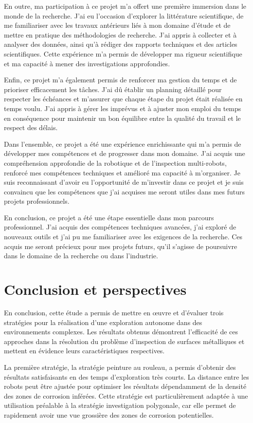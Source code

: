 \documentclass[francais,RandD]{rapportPFE}
\begin{document}
		En outre, ma participation à ce projet m'a offert une première immersion dans le monde de la recherche.
		J'ai eu l'occasion d'explorer la littérature scientifique, de me familiariser avec les travaux antérieurs liés à mon domaine d'étude et de mettre en pratique des méthodologies de recherche.
		J'ai appris à collecter et à analyser des données, ainsi qu'à rédiger des rapports techniques et des articles scientifiques.
		Cette expérience m'a permis de développer ma rigueur scientifique et ma capacité à mener des investigations approfondies.

		Enfin, ce projet m'a également permis de renforcer ma gestion du temps et de prioriser efficacement les tâches.
		J'ai dû établir un planning détaillé pour respecter les échéances et m'assurer que chaque étape du projet était réalisée en temps voulu.
		J'ai appris à gérer les imprévus et à ajuster mon emploi du temps en conséquence pour maintenir un bon équilibre entre la qualité du travail et le respect des délais.

		Dans l'ensemble, ce projet a été une expérience enrichissante qui m'a permis de développer mes compétences et de progresser dans mon domaine.
		J'ai acquis une compréhension approfondie de la robotique et de l'inspection multi-robots, renforcé mes compétences techniques et amélioré ma capacité à m'organiser.
		Je suis reconnaissant d'avoir eu l'opportunité de m'investir dans ce projet et je suis convaincu que les compétences que j'ai acquises me seront utiles dans mes futurs projets professionnels.

		En conclusion, ce projet a été une étape essentielle dans mon parcours professionnel.
		J'ai acquis des compétences techniques avancées, j'ai exploré de nouveaux outils et j'ai pu me familiariser avec les exigences de la recherche.
		Ces acquis me seront précieux pour mes projets futurs, qu'il s'agisse de poursuivre dans le domaine de la recherche ou dans l'industrie.
	\section{Conclusion et perspectives}
		En conclusion, cette étude a permis de mettre en œuvre et d'évaluer trois stratégies pour la réalisation d'une exploration autonome dans des environnements complexes.
		Les résultats obtenus démontrent l'efficacité de ces approches dans la résolution du problème d'inspection de surfaces métalliques et mettent en évidence leurs caractéristiques respectives.

		La première stratégie, la stratégie peinture au rouleau, a permis d'obtenir des résultats satisfaisants en des temps d'exploration très courts.
		La distance entre les robots peut être ajustée pour optimiser les résultats dépendamment de la densité des zones de corrosion inférées.
		Cette stratégie est particulièrement adaptée à une utilisation préalable à la stratégie investigation polygonale, car elle permet de rapidement avoir une vue grossière des zones de corrosion potentielles.
\end{document}
